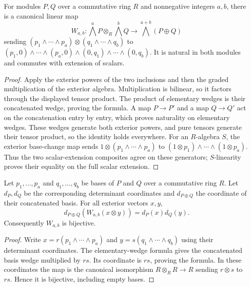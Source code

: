\begin{lemma}
\label{lem:exterior-product}
\leanok
For modules $P,Q$ over a commutative ring $R$ and nonnegative integers $a,b$,
there is a canonical linear map
\[
 W_{a,b}:\bigwedge^a P\otimes_R\bigwedge^b Q\longrightarrow
       \bigwedge^{a+b}(P\oplus Q)
\]
sending $(p_1\wedge\cdots\wedge p_a)\otimes
(q_1\wedge\cdots\wedge q_b)$ to
$(p_1,0)\wedge\cdots\wedge(p_a,0)\wedge
(0,q_1)\wedge\cdots\wedge(0,q_b)$.
It is natural in both modules and commutes with extension of scalars.
\end{lemma}
\begin{proof}
Apply the exterior powers of the two inclusions and then the graded
multiplication of the exterior algebra. Multiplication is bilinear, so it
factors through the displayed tensor product. The product of elementary
wedges is their concatenated wedge, proving the formula. A map $P\to P'$
and a map $Q\to Q'$ act on the concatenation entry by entry, which proves
naturality on elementary wedges. These wedges generate both exterior
powers, and pure tensors generate their tensor product, so the identity
holds everywhere. For an $R$-algebra $S$, the exterior base-change map
sends $1\otimes(p_1\wedge\cdots\wedge p_a)$ to
$(1\otimes p_1)\wedge\cdots\wedge(1\otimes p_a)$.
Thus the two scalar-extension composites agree on these generators;
$S$-linearity proves their equality on the full scalar extension.
\end{proof}

\begin{lemma}
\label{lem:determinant-product-free}
\leanok
Let $p_1,\ldots,p_a$ and $q_1,\ldots,q_b$ be bases of $P$ and $Q$
over a commutative ring $R$. Let $d_P,d_Q$ be the corresponding
determinant coordinates and $d_{P\oplus Q}$ the coordinate of their
concatenated basis. For all exterior vectors $x,y$,
\[
 d_{P\oplus Q}(W_{a,b}(x\otimes y))=d_P(x)d_Q(y).
\]
Consequently $W_{a,b}$ is bijective.
\end{lemma}
\begin{proof}
Write $x=r(p_1\wedge\cdots\wedge p_a)$ and
$y=s(q_1\wedge\cdots\wedge q_b)$ using their determinant coordinates.
The elementary-wedge formula gives the concatenated basis wedge multiplied
by $rs$. Its coordinate is $rs$, proving the formula. In these coordinates
the map is the canonical isomorphism $R\otimes_R R\to R$ sending
$r\otimes s$ to $rs$. Hence it is bijective, including empty bases.
\end{proof}

